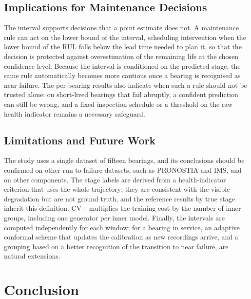 \documentclass[review]{elsarticle}
\begin{document}
\subsection{Implications for Maintenance Decisions}

The interval supports decisions that a point estimate does not. A
maintenance rule can act on the lower bound of the interval, scheduling
intervention when the lower bound of the RUL falls below the lead time
needed to plan it, so that the decision is protected against
overestimation of the remaining life at the chosen confidence level.
Because the interval is conditioned on the predicted stage, the same
rule automatically becomes more cautious once a bearing is recognised
as near failure. The per-bearing results also indicate when such a rule
should not be trusted alone: on short-lived bearings that fail
abruptly, a confident prediction can still be wrong, and a fixed
inspection schedule or a threshold on the raw health indicator remains
a necessary safeguard.

\subsection{Limitations and Future Work}

The study uses a single dataset of fifteen bearings, and its
conclusions should be confirmed on other run-to-failure datasets, such
as PRONOSTIA and IMS, and on other components. The stage labels are
derived from a health-indicator criterion that uses the whole
trajectory; they are consistent with the visible degradation but are
not ground truth, and the reference results by true stage inherit this
definition. CV+ multiplies the training cost by the number of inner
groups, including one generator per inner model. Finally, the intervals
are computed independently for each window; for a bearing in service,
an adaptive conformal scheme that updates the calibration as new
recordings arrive, and a grouping based on a better recognition of the
transition to near failure, are natural extensions.

\section{Conclusion}
\label{sec:conclusion}
\end{document}
